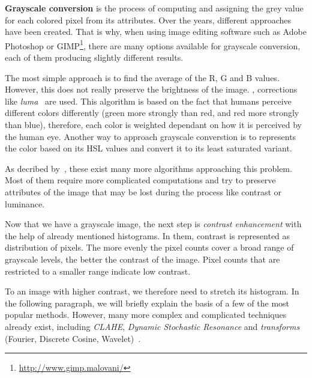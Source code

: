 \textbf{Grayscale conversion} is the process of computing and assigning the grey value for each colored pixel from its attributes. Over the years, different approaches have been created. That is why, when using image editing software such as Adobe Photoshop or GIMP\footnote{\url{http://www.gimp.malovani/}}, there are many options available for grayscale conversion, each of them producing slightly different results.

The most simple approach is to find the average of the R, G and B values. However, this does not really preserve the brightness of the image. , corrections like \emph{luma}~\cite{grayscaleConv} are used. This algorithm is based on the fact that humans perceive different colors  differently (green more strongly than red, and red more strongly than blue), therefore, each color is weighted dependant on how it is perceived by the human eye. Another way to approach grayscale converstion is to represents the color based on its HSL values and convert it to its least saturated variant.

As decribed by~\citet{grayscaleCadik}, these exist many more algorithms approaching this problem. Most of them require more complicated computations and try to preserve attributes of the image that may be lost during the process \xxx{-} like contrast or luminance.

Now that we have a grayscale image, the next step is \emph{contrast enhancement} with the help of already mentioned histograms. In them, contrast is represented as distribution of pixels. The more evenly the pixel counts cover a broad range of grayscale levels, the better the contrast of the image.  Pixel counts that are restricted to a smaller range indicate low contrast.

To   an image with  higher contrast, we therefore need to stretch its histogram. In the following paragraph, we will briefly explain the basis of a few of the most popular methods. However, many more complex and complicated techniques already exist, including
\emph{CLAHE}, \emph{Dynamic Stochastic Resonance} and \emph{transforms} (Fourier, Discrete Cosine, Wavelet)~\cite{contrastOther}.

